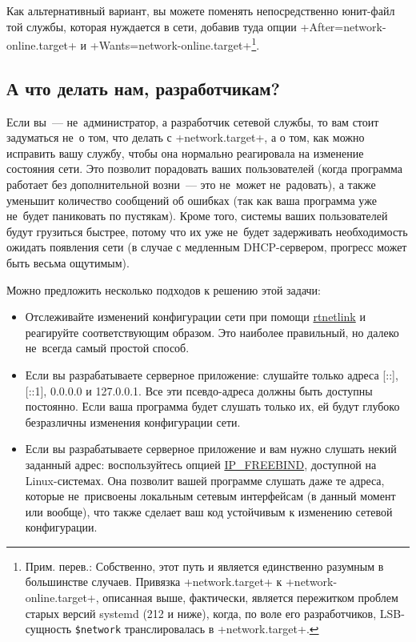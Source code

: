 \documentclass[10pt,oneside,a4paper]{article}
\begin{document}
Как альтернативный вариант, вы можете поменять непосредственно юнит-файл той
службы, которая нуждается в сети, добавив туда опции
+After=network-online.target+ и +Wants=network-online.target+\footnote{Прим.
перев.: Собственно, этот путь и является единственно разумным в большинстве
случаев. Привязка +network.target+ к +network-online.target+, описанная выше,
фактически, является пережитком проблем старых версий systemd (212 и ниже),
когда, по воле его разработчиков, LSB-сущность \texttt{\$network}
транслировалась в +network.target+.}.

\subsection{А что делать нам, разработчикам?}

Если вы~--- не~администратор, а разработчик сетевой службы, то вам стоит
задуматься не~о том, что делать с +network.target+, а о том, как можно исправить
вашу службу, чтобы она нормально реагировала на изменение состояния сети. Это
позволит порадовать ваших пользователей (когда программа работает без
дополнительной возни~--- это не~может не~радовать), а также уменьшит количество
сообщений об ошибках (так как ваша программа уже не~будет паниковать по
пустякам). Кроме того, системы ваших пользователей будут грузиться быстрее,
потому что их уже не~будет задерживать необходимость ожидать появления сети (в
случае с медленным DHCP-сервером, прогресс может быть весьма ощутимым).

Можно предложить несколько подходов к решению этой задачи:
\begin{itemize}
	\item Отслеживайте изменений конфигурации сети при помощи
		\href{https://www.kernel.org/doc/man-pages/online/pages/man7/rtnetlink.7.html}%
		{rtnetlink} и реагируйте соответствующим образом. Это наиболее
		правильный, но далеко не~всегда самый простой способ.
	\item Если вы разрабатываете серверное приложение: слушайте только
		адреса [::], [::1], 0.0.0.0 и 127.0.0.1. Все эти псевдо-адреса
		должны быть доступны постоянно. Если ваша программа будет
		слушать только их, ей будут глубоко безразличны изменения
		конфигурации сети.
	\item Если вы разрабатываете серверное приложение и вам нужно слушать
		некий заданный адрес: воспользуйтесь опцией
		\href{https://www.kernel.org/doc/man-pages/online/pages/man7/ip.7.html}%
		{IP\_FREEBIND}, доступной на Linux-системах. Она позволит вашей
		программе слушать даже те адреса, которые не~присвоены локальным
		сетевым интерфейсам (в данный момент или вообще), что также
		сделает ваш код устойчивым к изменению сетевой конфигурации.
\end{itemize}
\end{document}

